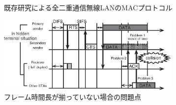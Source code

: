 \documentclass[master]{kuisthesis}		%
\begin{document}
			\begin{figure}[t]
				\begin{center}
					\\
					\caption{既存研究\cite{fdmac}による全二重通信無線LANのMACプロトコル}
					\label{fig:fdmac_protocol}
				\end{center}
			\end{figure}

			\begin{figure}[t]
				\begin{center}
					\includegraphics[width=0.8\textwidth]{fig/relay_not_equal2.eps}
					\caption{フレーム時間長が揃っていない場合の問題点}
					\label{fig:not_equal}
				\end{center}
			\end{figure}
\end{document}
